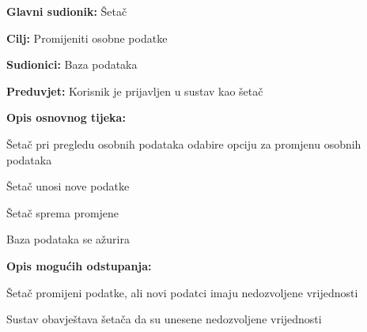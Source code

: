 					
					
					
					
					
					
					\noindent {}
					\begin{packed_item}
	
						\item \textbf{Glavni sudionik:} Šetač
						\item  \textbf{Cilj:} Promijeniti osobne podatke
						\item  \textbf{Sudionici:} Baza podataka
						\item  \textbf{Preduvjet:} Korisnik je prijavljen u sustav kao šetač
						\item  \textbf{Opis osnovnog tijeka:}
						
						\item[] \begin{packed_enum}
	
							\item Šetač pri pregledu osobnih podataka odabire opciju za promjenu osobnih podataka
							\item Šetač unosi nove podatke
							\item Šetač sprema promjene
							\item Baza podataka se ažurira
	
						\end{packed_enum}
						
						\item  \textbf{Opis mogućih odstupanja:}
						
						\item[] \begin{packed_item}
							\item[3.a] Šetač promijeni podatke, ali novi podatci imaju nedozvoljene vrijednosti
							\item[] \begin{packed_enum}
								\item Sustav obavještava šetača da su unesene nedozvoljene vrijednosti
							\end{packed_enum}
						\end{packed_item}
					\end{packed_item}
				
